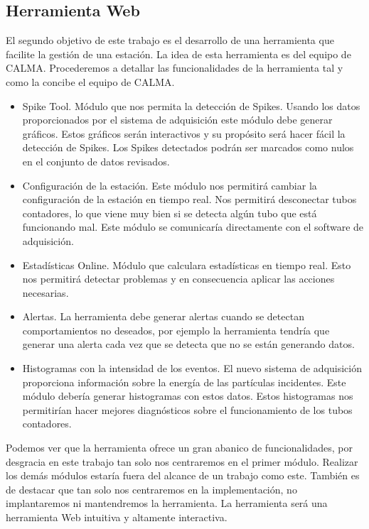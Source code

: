 	\subsection{Herramienta Web}
		El segundo objetivo de este trabajo es el desarrollo de una herramienta que facilite la gestión de una estación. La idea de esta
		herramienta es del equipo de CALMA. Procederemos a detallar las funcionalidades de la herramienta tal y como la concibe el equipo de
		CALMA.
		\begin{itemize}
	         	\item	Spike Tool. Módulo que nos permita la detección de Spikes. Usando los datos proporcionados por el sistema de
			  	adquisición este módulo debe generar gráficos. Estos gráficos serán interactivos y su propósito será hacer fácil la
				detección de Spikes. Los Spikes detectados podrán ser marcados como nulos en el conjunto de datos revisados. 
			\item 	Configuración de la estación. Este módulo nos permitirá cambiar la configuración de la estación en tiempo real. Nos
			  	permitirá desconectar tubos contadores, lo que viene muy bien si se detecta algún tubo que está funcionando mal. Este
				módulo se comunicaría directamente con el software de adquisición. 
			\item 	Estadísticas Online. Módulo que calculara estadísticas en tiempo real. Esto nos permitirá detectar problemas y en
			  	consecuencia aplicar las acciones necesarias. 
			\item	Alertas. La herramienta debe generar alertas cuando se detectan comportamientos no deseados, por ejemplo la
			  	herramienta tendría que generar una alerta cada vez que se detecta que no se están generando datos.
			\item 	Histogramas con la intensidad de los eventos. El nuevo sistema de adquisición proporciona información sobre la energía
			  	de las partículas incidentes. Este módulo debería generar histogramas con estos datos. Estos histogramas nos
				permitirían hacer mejores diagnósticos sobre el funcionamiento de los tubos contadores. 
		\end{itemize}
		Podemos ver que la herramienta ofrece un gran abanico de funcionalidades, por desgracia en este trabajo tan solo nos centraremos en el
		primer módulo. Realizar los demás módulos estaría fuera del alcance de un trabajo como este. También es de destacar que tan solo
		nos centraremos en la implementación, no implantaremos ni mantendremos la herramienta. La herramienta será una herramienta Web 
		intuitiva y altamente interactiva. 
		

